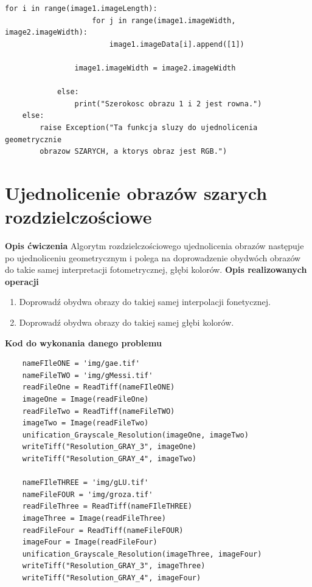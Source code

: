 \documentclass[magisterska,openany]{pracadypl}
\begin{document}
\begin{lstlisting}[caption={Geometryczne ujednolicanie obrazów szarych}]
                for i in range(image1.imageLength):
                    for j in range(image1.imageWidth, image2.imageWidth):
                        image1.imageData[i].append([1])

                image1.imageWidth = image2.imageWidth

            else:
                print("Szerokosc obrazu 1 i 2 jest rowna.")
    else:
        raise Exception("Ta funkcja sluzy do ujednolicenia geometrycznie 
        obrazow SZARYCH, a ktorys obraz jest RGB.")

\end{lstlisting}
\newpage

\section{Ujednolicenie obrazów szarych rozdzielczościowe}

\vspace{0.5cm}\textbf{\Large Opis ćwiczenia}
\vspace{0.25cm}\newline
Algorytm rozdzielczościowego ujednolicenia obrazów następuje po ujednoliceniu
geometrycznym i polega na doprowadzenie obydwóch obrazów do takie samej interpretacji fotometrycznej, głębi kolorów.
\newline
\newline
\textbf{\Large Opis realizowanych operacji}
\begin{enumerate}
\item Doprowadź obydwa obrazy do takiej samej interpolacji fonetycznej.
\item Doprowadź obydwa obrazy do takiej samej głębi kolorów.
\end{enumerate}

\vspace{0.5cm}
\textbf{\Large Kod do wykonania danego problemu}
\lstset{language=Python}
\vspace{0.25cm}
\begin{lstlisting}
	nameFIleONE = 'img/gae.tif'
	nameFileTWO = 'img/gMessi.tif'
	readFileOne = ReadTiff(nameFIleONE)
	imageOne = Image(readFileOne)
	readFileTwo = ReadTiff(nameFileTWO)
	imageTwo = Image(readFileTwo)
	unification_Grayscale_Resolution(imageOne, imageTwo)
	writeTiff("Resolution_GRAY_3", imageOne)
	writeTiff("Resolution_GRAY_4", imageTwo)

	nameFIleTHREE = 'img/gLU.tif'
	nameFileFOUR = 'img/groza.tif'
	readFileThree = ReadTiff(nameFIleTHREE)
	imageThree = Image(readFileThree)
	readFileFour = ReadTiff(nameFileFOUR)
	imageFour = Image(readFileFour)
	unification_Grayscale_Resolution(imageThree, imageFour)
	writeTiff("Resolution_GRAY_3", imageThree)
	writeTiff("Resolution_GRAY_4", imageFour)

\end{lstlisting}
\end{document}
